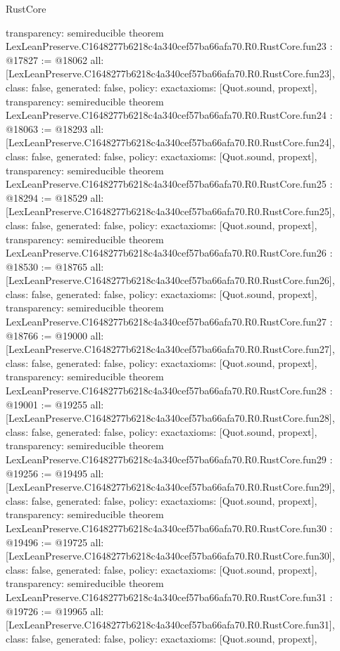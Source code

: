 \begin{lexlean}{RustCore}
\begin{coremodule}
{  transparency: semireducible
}
theorem LexLeanPreserve.C1648277b6218c4a340cef57ba66afa70.R0.RustCore.fun23 : @17827 := @18062 {
  all: [LexLeanPreserve.C1648277b6218c4a340cef57ba66afa70.R0.RustCore.fun23],
  class: false,
  generated: false,
  policy: exact{axioms: [Quot.sound, propext]},
  transparency: semireducible
}
theorem LexLeanPreserve.C1648277b6218c4a340cef57ba66afa70.R0.RustCore.fun24 : @18063 := @18293 {
  all: [LexLeanPreserve.C1648277b6218c4a340cef57ba66afa70.R0.RustCore.fun24],
  class: false,
  generated: false,
  policy: exact{axioms: [Quot.sound, propext]},
  transparency: semireducible
}
theorem LexLeanPreserve.C1648277b6218c4a340cef57ba66afa70.R0.RustCore.fun25 : @18294 := @18529 {
  all: [LexLeanPreserve.C1648277b6218c4a340cef57ba66afa70.R0.RustCore.fun25],
  class: false,
  generated: false,
  policy: exact{axioms: [Quot.sound, propext]},
  transparency: semireducible
}
theorem LexLeanPreserve.C1648277b6218c4a340cef57ba66afa70.R0.RustCore.fun26 : @18530 := @18765 {
  all: [LexLeanPreserve.C1648277b6218c4a340cef57ba66afa70.R0.RustCore.fun26],
  class: false,
  generated: false,
  policy: exact{axioms: [Quot.sound, propext]},
  transparency: semireducible
}
theorem LexLeanPreserve.C1648277b6218c4a340cef57ba66afa70.R0.RustCore.fun27 : @18766 := @19000 {
  all: [LexLeanPreserve.C1648277b6218c4a340cef57ba66afa70.R0.RustCore.fun27],
  class: false,
  generated: false,
  policy: exact{axioms: [Quot.sound, propext]},
  transparency: semireducible
}
theorem LexLeanPreserve.C1648277b6218c4a340cef57ba66afa70.R0.RustCore.fun28 : @19001 := @19255 {
  all: [LexLeanPreserve.C1648277b6218c4a340cef57ba66afa70.R0.RustCore.fun28],
  class: false,
  generated: false,
  policy: exact{axioms: [Quot.sound, propext]},
  transparency: semireducible
}
theorem LexLeanPreserve.C1648277b6218c4a340cef57ba66afa70.R0.RustCore.fun29 : @19256 := @19495 {
  all: [LexLeanPreserve.C1648277b6218c4a340cef57ba66afa70.R0.RustCore.fun29],
  class: false,
  generated: false,
  policy: exact{axioms: [Quot.sound, propext]},
  transparency: semireducible
}
theorem LexLeanPreserve.C1648277b6218c4a340cef57ba66afa70.R0.RustCore.fun30 : @19496 := @19725 {
  all: [LexLeanPreserve.C1648277b6218c4a340cef57ba66afa70.R0.RustCore.fun30],
  class: false,
  generated: false,
  policy: exact{axioms: [Quot.sound, propext]},
  transparency: semireducible
}
theorem LexLeanPreserve.C1648277b6218c4a340cef57ba66afa70.R0.RustCore.fun31 : @19726 := @19965 {
  all: [LexLeanPreserve.C1648277b6218c4a340cef57ba66afa70.R0.RustCore.fun31],
  class: false,
  generated: false,
  policy: exact{axioms: [Quot.sound, propext]},
}
\end{coremodule}
\end{lexlean}
